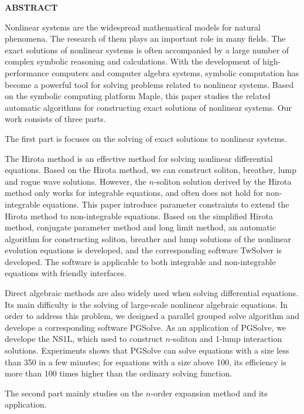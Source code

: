 {}
\centerline{\bfseries ABSTRACT}

\linespread{1.4}
\bigskip

Nonlinear systems are the widespread mathematical models for natural phenomena. The research of them plays an important role in many fields. The exact solutions of nonlinear systems is often accompanied by a large number of complex symbolic reasoning and calculations. With the development of high-performance computers and computer algebra systems, symbolic computation has become a powerful tool for solving problems related to nonlinear systems. Based on the symbolic computing platform Maple, this paper studies the related automatic algorithms for constructing exact solutions of nonlinear systems. Our work consists of three parts.

The first part is focuses on the solving of exact solutions to nonlinear systems.

The Hirota method is an effective method for solving nonlinear differential equations. Based on the Hirota method, we can construct soliton, breather, lump and rogue wave solutions. However, the $n$-soliton solution derived by the Hirota method  only works for integrable equations, and often does not hold for non-integrable equations. This paper introduce parameter constraints to extend the Hirota method to  non-integrable equations. Based on the simplified Hirota method, conjugate parameter method and long limit method, an automatic algorithm for constructing soliton, breather and lump solutions of the nonlinear evolution equations is developed, and the corresponding software TwSolver is developed. The software is applicable to both integrable and non-integrable equations with friendly interfaces. 

Direct algebraic methods are also widely used when solving differential equations. Its main difficulty is the solving of large-scale nonlinear algebraic equations. In order to address this problem, we designed a parallel grouped solve algorithm and develope a corresponding software PGSolve. As an application of PGSolve, we develope  the NS1L,  which used to construct $n$-soliton and 1-lump interaction solutions. Experiments shows that PGSolve can solve equations with a size less than 350 in a few minutes; for equations with a size above 100, its efficiency is more than 100 times higher than the ordinary solving function.

The second part mainly studies on the $n$-order expansion method and its application.

